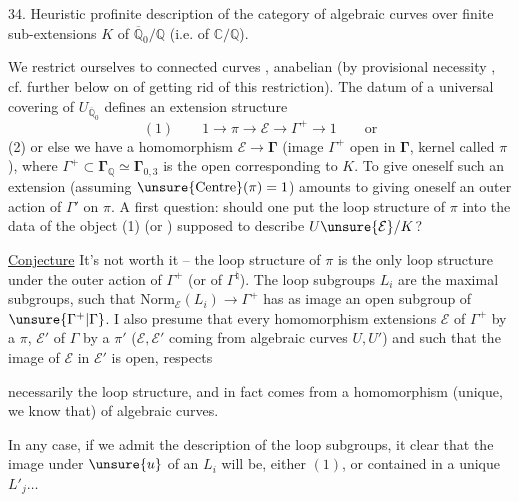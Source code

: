 34. Heuristic profinite description of the category
of algebraic curves  over  finite sub-extensions
$K$ of $\overline{\mathbb Q}_0/\mathbb Q$ (i.e. of $\mathbb C/\mathbb Q$).

We restrict ourselves to  connected curves , anabelian
(by provisional necessity \unsure{!}, cf. further below on  of
getting rid of this restriction). The datum of
a universal covering of  $U_{\overline{\mathbb Q}_0}$ defines an
extension structure
\[
(1)\qquad 1\longrightarrow\pi\longrightarrow\mathcal E\longrightarrow\Gamma^{+}\longrightarrow1\qquad\text{or}
\]
(2) or else we have a homomorphism $\mathcal E\longrightarrow\boldsymbol{\Gamma}$
(image $\Gamma^{+}$ open in $\boldsymbol{\Gamma}$,
kernel called $\pi$),
where $\Gamma^{+}\subset\boldsymbol{\Gamma}_{\mathbb Q}\simeq\boldsymbol{\Gamma}_{0,3}$ is the open 
corresponding to $K$. To give oneself such an
extension (assuming $\unsure{\mathrm{Centre}}(\pi)=1$) amounts to
giving oneself an outer action of $\Gamma'$ on $\pi$.
A first question: should one put the
loop structure of $\pi$ into the  data  of
the object (1) (or ) supposed to describe $U\unsure{\mathcal E}/K$?

\uline{Conjecture} It's not worth it -- the loop structure
of $\pi$ is the only loop structure 
under the outer action of $\Gamma^{+}$ (or of $\Gamma^{\natural}$). The
loop subgroups $L_i$ are the maximal
subgroups, such that $\mathrm{Norm}_{\mathcal E}(L_i)\longrightarrow\Gamma^{+}$ has
as image an open subgroup of $\unsure{\Gamma^{+}|\Gamma}$.
I
also presume that every homomorphism  extensions
$\mathcal E$ of $\Gamma^{+}$ by a $\pi$, $\mathcal E'$ of $\Gamma$ by a $\pi'$
($\mathcal E,\mathcal E'$ coming from algebraic curves $U,U'$) and such
that the image of $\mathcal E$ in $\mathcal E'$ is open, respects

necessarily the loop structure, and in fact
comes from a homomorphism (unique, we know that) of algebraic
curves.

In any case, if we admit the description of the
loop subgroups, it  clear that the image under
$\unsure{u}$ of an $L_i$ will be, either $(1)$, or contained
in a unique $L'_j\ldots$

